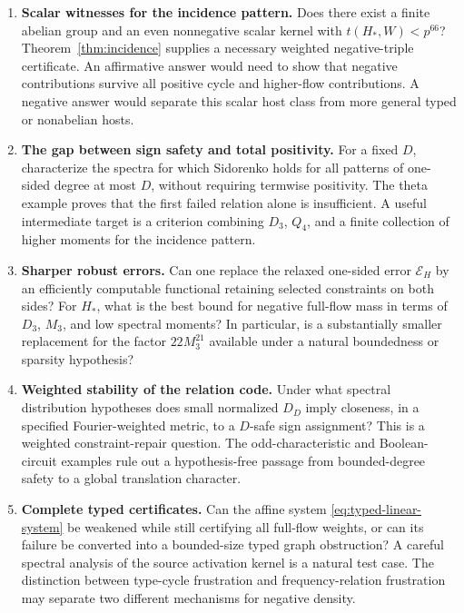 \documentclass[11pt]{article}
\numberwithin{equation}{section}
\theoremstyle{definition}
\theoremstyle{remark}
\newcommand{\Err}{\mathcal E}
\newcommand{\Hstar}{H_{\!*}}
\begin{document}
\begin{enumerate}[leftmargin=*,label=\textbf{Q\arabic*.}]
\item \textbf{Scalar witnesses for the incidence pattern.}
Does there exist a finite abelian group and an even nonnegative scalar
kernel with $t(\Hstar,W)<p^{66}$? Theorem~\ref{thm:incidence} supplies a
necessary weighted negative-triple certificate. An affirmative answer
would need to show that negative contributions survive all positive
cycle and higher-flow contributions. A negative answer would separate
this scalar host class from more general typed or nonabelian hosts.

\item \textbf{The gap between sign safety and total positivity.}
For a fixed $D$, characterize the spectra for which Sidorenko holds for
all patterns of one-sided degree at most $D$, without requiring
termwise positivity. The theta example proves that the first failed
relation alone is insufficient. A useful intermediate target is a
criterion combining $D_3$, $Q_4$, and a finite collection of higher
moments for the incidence pattern.

\item \textbf{Sharper robust errors.}
Can one replace the relaxed one-sided error $\Err_H$ by an efficiently
computable functional retaining selected constraints on both sides?
For $\Hstar$, what is the best bound for negative full-flow mass in
terms of $D_3$, $M_3$, and low spectral moments? In particular, is a
substantially smaller replacement for the factor $22M_3^{21}$ available
under a natural boundedness or sparsity hypothesis?

\item \textbf{Weighted stability of the relation code.}
Under what spectral distribution hypotheses does small normalized
$D_D$ imply closeness, in a specified Fourier-weighted metric, to a
$D$-safe sign assignment? This is a weighted constraint-repair question.
The odd-characteristic and Boolean-circuit examples rule out a
hypothesis-free passage from bounded-degree safety to a global
translation character.

\item \textbf{Complete typed certificates.}
Can the affine system \eqref{eq:typed-linear-system} be weakened while
still certifying all full-flow weights, or can its failure be converted
into a bounded-size typed graph obstruction? A careful spectral analysis
of the source activation kernel is a natural test case. The distinction
between type-cycle frustration and frequency-relation frustration may
separate two different mechanisms for negative density.


\end{enumerate}
\end{document}
